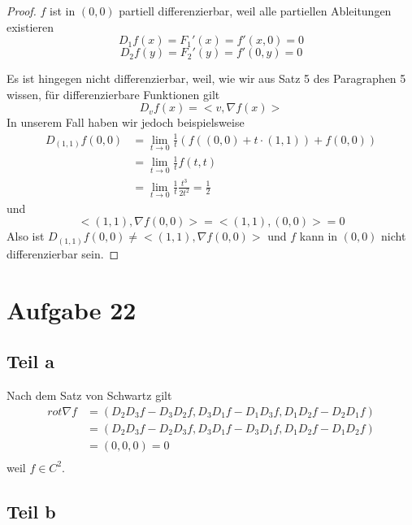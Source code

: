 \documentclass[10pt,a4paper]{article}
\begin{document}
\begin{proof}
$f$ ist in $(0, 0)$ partiell differenzierbar, weil alle partiellen Ableitungen existieren
\begin{equation}
D_{1}f(x) = F_{1}'(x) = f'(x, 0) = 0
\end{equation}
\begin{equation}
D_{2}f(y) = F_{2}'(y) = f'(0, y) = 0
\end{equation}

Es ist hingegen nicht differenzierbar, weil, wie wir aus Satz 5 des Paragraphen 5 wissen, für differenzierbare Funktionen gilt
\begin{equation}
D_{v}f(x) = <v, \nabla f(x)>
\end{equation}
In unserem Fall haben wir jedoch beispielsweise
\begin{align*}
D_{(1, 1)}f(0, 0) & = \lim_{t \rightarrow 0} \frac{1}{t} (f((0, 0) + t \cdot (1, 1)) + f(0, 0))\\
& = \lim_{t \rightarrow 0} \frac{1}{t} f(t, t)\\
& = \lim_{t \rightarrow 0} \frac{1}{t} \frac{t^{3}}{2t^{2}} = \frac{1}{2}
\end{align*}
und
\begin{equation}
<(1, 1), \nabla f(0, 0)> = <(1, 1), (0, 0)> = 0
\end{equation}
Also ist $D_{(1, 1)}f(0, 0) \ne <(1, 1), \nabla f(0, 0)>$ und $f$ kann in $(0, 0)$ nicht differenzierbar sein.
\end{proof}

\section*{Aufgabe 22}

\subsection*{Teil a}

Nach dem Satz von Schwartz gilt
\begin{align*}
rot \nabla f & = (D_{2}D_{3}f - D_{3}D_{2}f, D_{3}D_{1}f - D_{1}D_{3}f, D_{1}D_{2}f - D_{2}D_{1}f)\\
& = (D_{2}D_{3}f - D_{2}D_{3}f, D_{3}D_{1}f - D_{3}D_{1}f, D_{1}D_{2}f - D_{1}D_{2}f)\\
& = (0, 0, 0) = 0\\
\end{align*}
weil $f \in C^{2}$.

\subsection*{Teil b}
\end{document}
